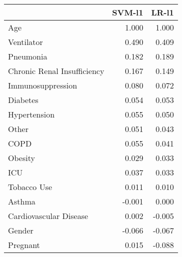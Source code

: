 \begin{tabular}{lrr}
\toprule
{} &  SVM-l1 &  LR-l1 \\
\midrule
Age                         &   1.000 &  1.000 \\
Ventilator                  &   0.490 &  0.409 \\
Pneumonia                   &   0.182 &  0.189 \\
Chronic Renal Insufficiency &   0.167 &  0.149 \\
Immunosuppression           &   0.080 &  0.072 \\
Diabetes                    &   0.054 &  0.053 \\
Hypertension                &   0.055 &  0.050 \\
Other                       &   0.051 &  0.043 \\
COPD                        &   0.055 &  0.041 \\
Obesity                     &   0.029 &  0.033 \\
ICU                         &   0.037 &  0.033 \\
Tobacco Use                 &   0.011 &  0.010 \\
Asthma                      &  -0.001 &  0.000 \\
Cardiovascular Disease      &   0.002 & -0.005 \\
Gender                      &  -0.066 & -0.067 \\
Pregnant                    &   0.015 & -0.088 \\
\bottomrule
\end{tabular}
